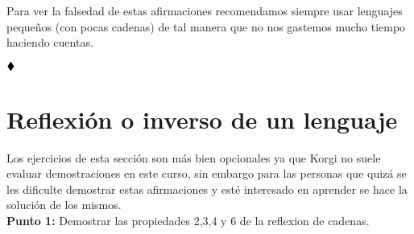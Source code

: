 Para ver la falsedad de estas afirmaciones recomendamos siempre usar lenguajes pequeños (con pocas cadenas) de tal manera que no nos gastemos mucho tiempo haciendo cuentas. 


$\hfill \blacklozenge$

\section{Reflexión o inverso de un lenguaje}

Los ejercicios de esta sección son más bien opcionales ya que Korgi no suele evaluar demostraciones en este curso, sin embargo para las personas que quizá se les dificulte demostrar estas afirmaciones y esté interesado en aprender se hace la solución de los mismos.\\

\textbf{Punto 1: }Demostrar las propiedades 2,3,4 y 6 de la reflexion de cadenas. 

